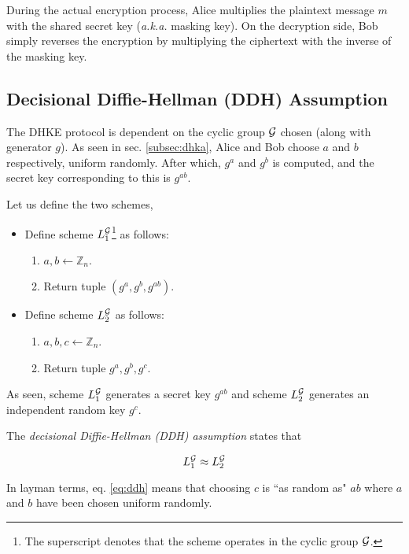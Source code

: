 During the actual encryption process, Alice multiplies the plaintext message \( m \) with the shared secret key (\textit{a.k.a.} masking key).
On the decryption side, Bob simply reverses the encryption by multiplying the ciphertext with the inverse of the masking key.

\subsection{Decisional Diffie-Hellman (DDH) Assumption}

The DHKE protocol is dependent on the cyclic group \( \mathcal{G} \) chosen (along with generator \( g \)).
As seen in sec. \ref{subsec:dhka}, Alice and Bob choose \( a \) and \( b \) respectively, uniform randomly. 
After which, \( g^a \) and \( g^b \) is computed, and the secret key corresponding to this is \( g^{ab} \).

Let us define the two schemes,

\begin{itemize}
    \item Define scheme \( L_1^{\mathcal{G}} \)\footnote{The superscript denotes that the scheme operates in the cyclic group \( \mathcal{G} \).} as follows: 
    \begin{enumerate}
        \item \( a, b \leftarrow \mathbb{Z}_n \).
        \item Return tuple \( (g^a, g^b, g^{ab}) \).
    \end{enumerate}

    \item Define scheme \( L_2^{\mathcal{G}} \) as follows: 
    \begin{enumerate}
        \item \( a, b, c \leftarrow \mathbb{Z}_n \).
        \item Return tuple \( g^a, g^b, g^c \).
    \end{enumerate}
\end{itemize}

As seen, scheme \( L_1^{\mathcal{G}} \) generates a secret key \( g^{ab} \) and scheme \( L_2^{\mathcal{G}} \) generates an independent random key \( g^c \).

The \textit{decisional Diffie-Hellman (DDH) assumption} states that

\begin{equation} \label{eq:ddh} 
    L_1^{\mathcal{G}} \approx L_2^{\mathcal{G}}
\end{equation}

In layman terms, eq. \ref{eq:ddh} means that choosing \( c \) is ``as random as" \( ab \) where \( a \) and \( b \) have been chosen uniform randomly.

